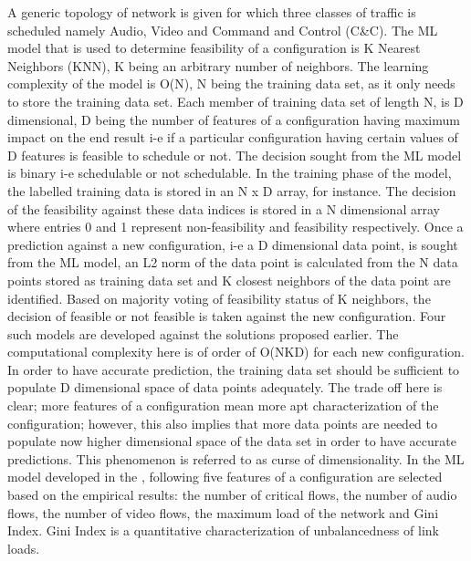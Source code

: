 \documentclass[journal,12pt,twocolumn]{IEEEtran}
\begin{document}
A generic topology of network is given for which three classes of traffic is scheduled namely Audio, Video and Command and Control (C\&C). The ML model that is used to determine feasibility of a configuration is K Nearest Neighbors (KNN), K being an arbitrary number of neighbors. The learning complexity of the model is O(N), N being the training data set, as it only needs to store the training data set. Each member of training data set of length N, is D dimensional, D being the number of features of a configuration having maximum impact on the end result i-e if a particular configuration having certain values of D features is feasible to schedule or not. The decision sought from the ML model is binary i-e schedulable or not schedulable.
In the training phase of the model, the labelled training data is stored in an N x D array, for instance. The decision of the feasibility against these data indices is stored in a N dimensional array where entries 0 and 1 represent non-feasibility and feasibility respectively. Once a prediction against a new configuration, i-e a D dimensional data point, is sought from the ML model, an L2 norm of the data point is calculated from the N data points stored as training data set and K closest neighbors of the data point are identified. Based on majority voting of feasibility status of K neighbors, the decision of feasible or not feasible is taken against the new configuration. Four such models are developed against the solutions proposed earlier. The computational complexity here is of order of O(NKD) for each new configuration.
In order to have accurate prediction, the training data set should be sufficient to populate D dimensional space of data points adequately. The trade off here is clear; more features of a configuration mean more apt characterization of the configuration; however, this also implies that more data points are needed to populate now higher dimensional space of the data set in order to have accurate predictions. This phenomenon is referred to as curse of dimensionality.
In the ML model developed in the \cite{ML}, following five features of a configuration are selected based on the empirical results: the number of critical flows, the number of audio flows, the number of video flows, the maximum load of the network and Gini Index. Gini Index \cite{GINI} is a quantitative characterization of unbalancedness of link loads.
\end{document}
